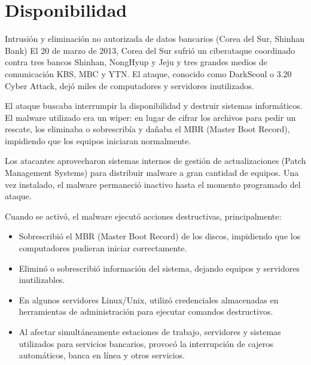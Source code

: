 \section{Disponibilidad}

\begin{caso}{Intrusión y eliminación no autorizada de datos bancarios (Corea del Sur, Shinhan Bank)}
El 20 de marzo de 2013, Corea del Sur sufrió un ciberataque coordinado contra tres bancos Shinhan, NongHyup y Jeju y tres grandes medios de comunicación KBS, MBC y YTN. El ataque, conocido como DarkSeoul o 3.20 Cyber Attack, dejó miles de computadores y servidores inutilizados. 
\end{caso}


\nocite{sk-seeker,sk-nbc,sk-darkreading}

\begin{respuesta}
El ataque buscaba interrumpir la disponibilidad y destruir sistemas informáticos. El malware utilizado era un wiper: en lugar de cifrar los archivos para pedir un rescate, los eliminaba o sobrescribía y dañaba el MBR (Master Boot Record), impidiendo que los equipos iniciaran normalmente. 
\end{respuesta}

\begin{respuesta}
Los atacantes aprovecharon sistemas internos de gestión de actualizaciones (Patch Management Systems) para distribuir malware a gran cantidad de equipos. Una vez instalado, el malware permaneció inactivo hasta el momento programado del ataque. 


Cuando se activó, el malware ejecutó acciones destructivas, principalmente:

\begin{itemize}
  \item Sobrescribió el MBR (Master Boot Record) de los discos, impidiendo que los computadores pudieran iniciar correctamente.  
  \item Eliminó o sobrescribió información del sistema, dejando equipos y servidores inutilizables.  
  \item En algunos servidores Linux/Unix, utilizó credenciales almacenadas en herramientas de administración para ejecutar comandos destructivos.  
  \item Al afectar simultáneamente estaciones de trabajo, servidores y sistemas utilizados para servicios bancarios, provocó la interrupción de cajeros automáticos, banca en línea y otros servicios. 
\end{itemize}

\end{respuesta}

